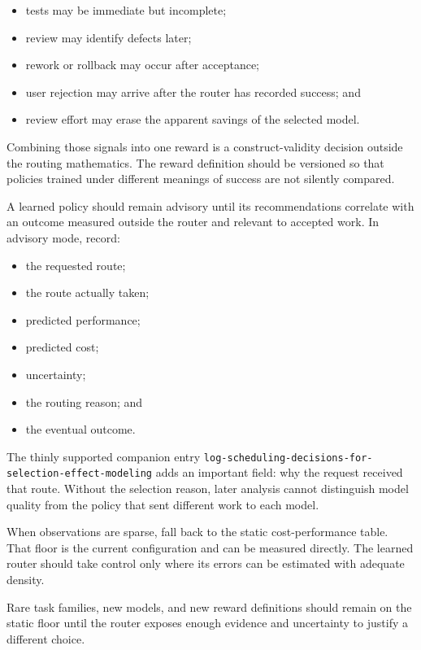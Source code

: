 \begin{itemize}
\tightlist
\item
  tests may be immediate but incomplete;
\item
  review may identify defects later;
\item
  rework or rollback may occur after acceptance;
\item
  user rejection may arrive after the router has recorded success; and
\item
  review effort may erase the apparent savings of the selected model.
\end{itemize}

Combining those signals into one reward is a construct-validity decision outside the routing mathematics. The reward definition should be versioned so that policies trained under different meanings of success are not silently compared.


A learned policy should remain advisory until its recommendations correlate with an outcome measured outside the router and relevant to accepted work. In advisory mode, record:

\begin{itemize}
\tightlist
\item
  the requested route;
\item
  the route actually taken;
\item
  predicted performance;
\item
  predicted cost;
\item
  uncertainty;
\item
  the routing reason; and
\item
  the eventual outcome.
\end{itemize}

The thinly supported companion entry \texttt{log-scheduling-decisions-for-selection-effect-modeling} adds an important field: why the request received that route. Without the selection reason, later analysis cannot distinguish model quality from the policy that sent different work to each model.

When observations are sparse, fall back to the static cost-performance table. That floor is the current configuration and can be measured directly. The learned router should take control only where its errors can be estimated with adequate density.

Rare task families, new models, and new reward definitions should remain on the static floor until the router exposes enough evidence and uncertainty to justify a different choice.

